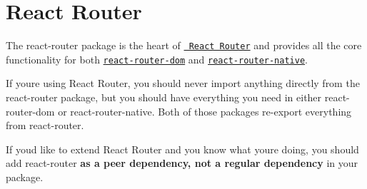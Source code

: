 \chapter{React Router}
\hypertarget{md__2home_2solype_2delivery_2current__days_2Mannheim_2front_2node__modules_2react-router_2README}{}\label{md__2home_2solype_2delivery_2current__days_2Mannheim_2front_2node__modules_2react-router_2README}
\label{md__2home_2solype_2delivery_2current__days_2Mannheim_2front_2node__modules_2react-router_2README_autotoc_md5466}%
%
 The {\ttfamily react-\/router} package is the heart of \href{https://github.com/remix-run/react-router}{\texttt{ React Router}} and provides all the core functionality for both \href{https://github.com/remix-run/react-router/tree/main/packages/react-router-dom}{\texttt{ {\ttfamily react-\/router-\/dom}}} and \href{https://github.com/remix-run/react-router/tree/main/packages/react-router-native}{\texttt{ {\ttfamily react-\/router-\/native}}}.

If you\textquotesingle{}re using React Router, you should never {\ttfamily import} anything directly from the {\ttfamily react-\/router} package, but you should have everything you need in either {\ttfamily react-\/router-\/dom} or {\ttfamily react-\/router-\/native}. Both of those packages re-\/export everything from {\ttfamily react-\/router}.

If you\textquotesingle{}d like to extend React Router and you know what you\textquotesingle{}re doing, you should add {\ttfamily react-\/router} {\bfseries{as a peer dependency, not a regular dependency}} in your package. 
